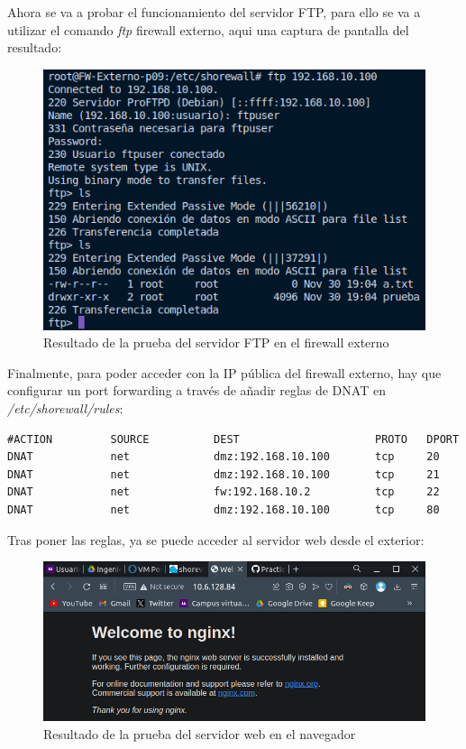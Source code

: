 \documentclass[11pt]{report}
\begin{document}
Ahora se va a probar el funcionamiento del servidor FTP, para ello se va a utilizar el comando \emph{ftp} firewall externo, aqui una
captura de pantalla del resultado:
\begin{figure}[H]
  \centering
  \includegraphics[scale=0.55]{img/ftp.png}
  \caption{Resultado de la prueba del servidor FTP en el firewall externo}
  \label{fig:Resultado de la prueba del servidor FTP en el firewall externo}
\end{figure}

Finalmente, para poder acceder con la IP pública del firewall externo, hay que configurar un port forwarding
a través de añadir reglas de DNAT en \emph{/etc/shorewall/rules}:
\begin{verbatim}
#ACTION         SOURCE          DEST                     PROTO   DPORT
DNAT            net             dmz:192.168.10.100       tcp     20
DNAT            net             dmz:192.168.10.100       tcp     21
DNAT            net             fw:192.168.10.2          tcp     22
DNAT            net             dmz:192.168.10.100       tcp     80
\end{verbatim}

Tras poner las reglas, ya se puede acceder al servidor web desde el exterior:
\begin{figure}[H]
  \centering
  \includegraphics[scale=0.55]{img/nginx_navegador.png}
  \caption{Resultado de la prueba del servidor web en el navegador}
  \label{fig:resultado de la prueba del servidor web en el navegador}
\end{figure}
\end{document}
